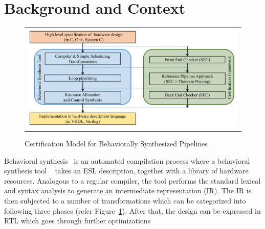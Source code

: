 \section{Background and Context}
\label{sec:background}

\begin{figure}
\begin{center}
\begin{tabular}{c}
\includegraphics[height=2in]{fig-proposal/certification-framework}
\end{tabular}
\end{center}
\caption{Certification Model for Behaviorally Synthesized Pipelines}
\label{fig:certification-framework}
\end{figure}

Behavioral synthesis~\cite{lin:survey-97} is an automated compilation process where a behavioral synthesis tool ~\cite{spark,xpilot,legup}  takes an ESL description, together with a library of hardware resources. Analogous to a regular compiler,
the tool performs the standard lexical and syntax analysis to generate an intermediate representation (IR). The IR is then subjected to a number of
transformations which can be categorized into following three phases (refer Figure~\ref{fig:certification-framework}). After that, the design can be expressed in
RTL which goes through further optimizations

